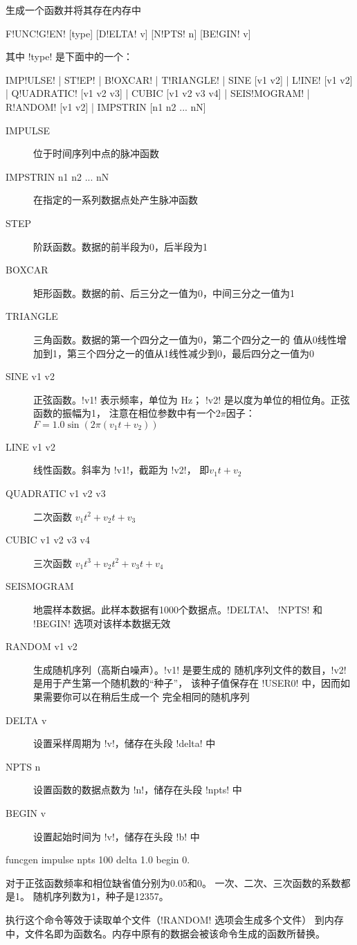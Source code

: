 \label{cmd:funcgen}

生成一个函数并将其存在内存中

\begin{SACSTX}
F!UNC!G!EN! [type] [D!ELTA! v] [N!PTS! n] [BE!GIN! v]
\end{SACSTX}
其中 !type! 是下面中的一个：
\begin{SACSTX}
IMP!ULSE! | ST!EP! | B!OXCAR! | T!RIANGLE! | SINE [v1 v2] | L!INE! [v1 v2] |
Q!UADRATIC! [v1 v2 v3] | CUBIC [v1 v2 v3 v4] | SEIS!MOGRAM! |
R!ANDOM! [v1 v2] | IMPSTRIN  [n1 n2 ... nN]
\end{SACSTX}

\begin{description}
\item [IMPULSE] 位于时间序列中点的脉冲函数
\item [IMPSTRIN n1 n2 ... nN] 在指定的一系列数据点处产生脉冲函数
\item [STEP] 阶跃函数。数据的前半段为0，后半段为1
\item [BOXCAR] 矩形函数。数据的前、后三分之一值为0，中间三分之一值为1
\item [TRIANGLE] 三角函数。数据的第一个四分之一值为0，第二个四分之一的
    值从0线性增加到1，第三个四分之一的值从1线性减少到0，最后四分之一值为0
\item [SINE v1 v2] 正弦函数。!v1! 表示频率，单位为 \si{\Hz}；
    !v2! 是以度为单位的相位角。正弦函数的振幅为1，
    注意在相位参数中有一个$2\pi$因子：$F = 1.0 \sin (2\pi (v_1t+v_2))$
\item [LINE v1 v2] 线性函数。斜率为 !v1!，截距为 !v2!，
    即$ v_1 t + v_2 $
\item [QUADRATIC v1 v2 v3] 二次函数 $v_1 t^{2} + v_2 t + v_3 $
\item [CUBIC v1 v2 v3 v4] 三次函数 $ v_1 t^{3} + v_2 t^2 + v_3t + v_4 $
\item [SEISMOGRAM] 地震样本数据。此样本数据有1000个数据点。!DELTA!、
    !NPTS! 和 !BEGIN! 选项对该样本数据无效
\item [RANDOM v1 v2] 生成随机序列（高斯白噪声）。!v1! 是要生成的
    随机序列文件的数目，!v2! 是用于产生第一个随机数的``种子''，
    该种子值保存在 !USER0! 中，因而如果需要你可以在稍后生成一个
    完全相同的随机序列
\item [DELTA v] 设置采样周期为 !v!，储存在头段 !delta! 中
\item [NPTS n] 设置函数的数据点数为 !n!，储存在头段 !npts! 中
\item [BEGIN v] 设置起始时间为 !v!，储存在头段 !b! 中
\end{description}

\begin{SACDFT}
funcgen impulse npts 100 delta 1.0 begin 0.
\end{SACDFT}
对于正弦函数频率和相位缺省值分别为0.05和0。
一次、二次、三次函数的系数都是1。
随机序列数为1，种子是12357。

执行这个命令等效于读取单个文件（!RANDOM! 选项会生成多个文件）
到内存中，文件名即为函数名。内存中原有的数据会被该命令生成的函数所替换。
